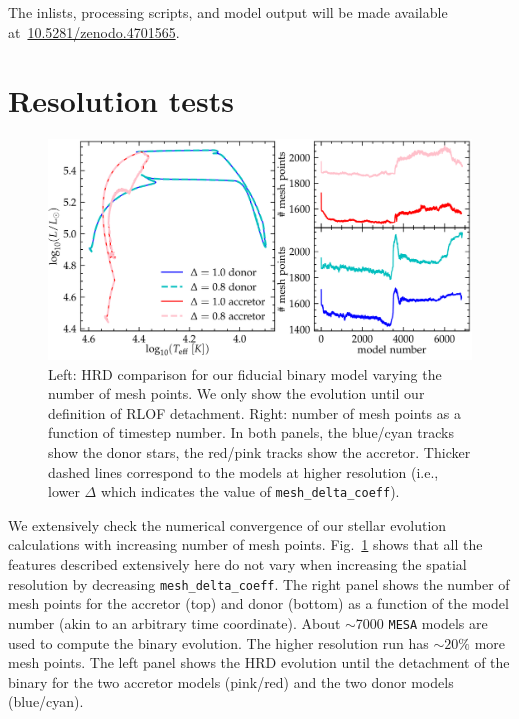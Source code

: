 \documentclass[twocolumn,twocolappendix,trackchanges]{aastex63}
\DeclareRobustCommand{\Figref}[1]{Fig.~\ref{#1}}
\begin{document}
The inlists, processing scripts, and model output will be made available at~\url{10.5281/zenodo.4701565}.

\section{Resolution tests}
\label{sec:res_tests}


\begin{figure}[hp]
  \centering
  \includegraphics[width=\textwidth]{spatial_res_plot}
  \caption{Left: HRD comparison for our fiducial binary model varying
  the number of mesh points. We only show the evolution until our definition
  of RLOF detachment. Right: number of mesh points as a
  function of timestep number. In both panels, the blue/cyan tracks show the donor stars, the
red/pink tracks show the accretor. Thicker dashed lines correspond to
the models at higher resolution (i.e., lower $\Delta$ which indicates
the value of \texttt{mesh\_delta\_coeff}).}
\label{fig:sp_test}
\end{figure}



We extensively check the numerical convergence of our stellar
evolution calculations with increasing number of mesh
points. \Figref{fig:sp_test} shows that all the features described
extensively here do not vary when increasing the spatial resolution by
decreasing \texttt{mesh\_delta\_coeff}. The right panel shows the
number of mesh points for the accretor (top) and donor (bottom) as a
function of the model number (akin to an arbitrary time
coordinate). About $\sim$7000 \texttt{MESA} models are used to compute
the binary evolution. The higher resolution run has $\sim 20\%$ more
mesh points. The left panel shows the HRD evolution until the
detachment of the binary for the two accretor models (pink/red) and
the two donor models (blue/cyan).
\end{document}
